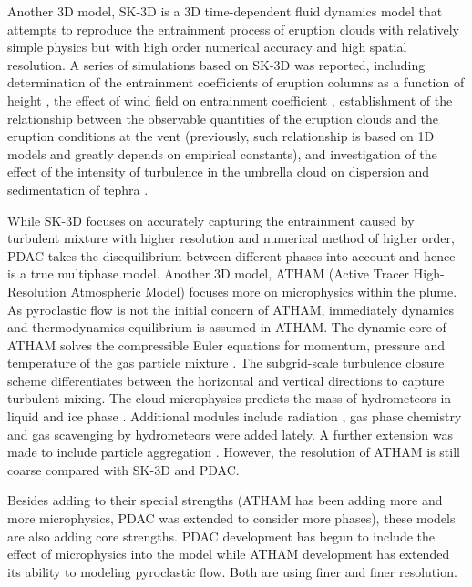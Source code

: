 \documentclass[journal abbreviation, manuscript]{copernicus}
\begin{document}
Another 3D model, SK-3D \citep{suzuki2005numerical} is a 3D time-dependent fluid dynamics model that attempts to reproduce the entrainment process of eruption clouds with relatively simple physics but with high order numerical accuracy and high spatial resolution.
A series of simulations based on SK-3D was reported, including determination of the entrainment coefficients of eruption columns as a function of height \citep{suzuki2010numerical}, the effect of wind field on entrainment coefficient \citep{suzuki20133d}, establishment of the relationship between the observable quantities of the eruption clouds and the eruption conditions at the vent \citep{suzuki2009three} (previously, such relationship is based on 1D models and greatly depends on empirical constants), and investigation of the effect of the intensity of turbulence in the umbrella cloud on dispersion and sedimentation of tephra \citep{koyaguchi2009effect}. 

While SK-3D focuses on accurately capturing the entrainment caused by turbulent mixture with higher resolution and numerical method of higher order, PDAC takes the disequilibrium between different phases into account and hence is a true multiphase model. Another 3D model, ATHAM (Active Tracer High-Resolution Atmospheric Model) \citep{oberhuber1998volcanic} focuses more on microphysics within the plume. As pyroclastic flow is not the initial concern of ATHAM, immediately dynamics and thermodynamics equilibrium is assumed in ATHAM. The dynamic core of ATHAM solves the compressible Euler equations for momentum, pressure and temperature of the gas particle mixture \citep{oberhuber1998volcanic}. The subgrid-scale turbulence closure scheme differentiates between the horizontal and vertical directions \citep{herzog2003prognostic} to capture turbulent mixing. The cloud microphysics predicts the mass of hydrometeors in liquid and ice phase \citep{herzog1998effect}. Additional modules include radiation \citep{langmann1997radiative}, gas phase chemistry \citep{trentmann2002simulation} and gas scavenging by hydrometeors \citep{textor2003injection} were added lately. A further extension was made to include particle aggregation \citep{textor2006volcanic1, textor2006volcanic2}. However, the resolution of ATHAM is still coarse compared with SK-3D and PDAC.

Besides adding to their special strengths (ATHAM has been adding more and more microphysics, PDAC was extended to consider more phases), these models are also adding core strengths. PDAC development has begun to include the effect of microphysics into the model while ATHAM development has extended its ability to modeling pyroclastic flow. Both are using finer and finer resolution. 
\end{document}
